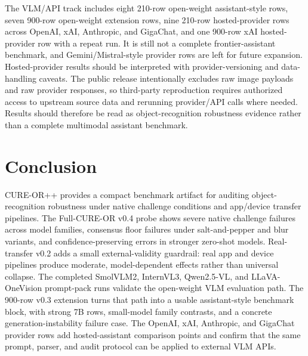 \documentclass[10pt]{article}
\begin{document}
The VLM/API track includes eight 210-row open-weight assistant-style rows, seven 900-row open-weight extension rows, nine 210-row hosted-provider rows across OpenAI, xAI, Anthropic, and GigaChat, and one 900-row xAI hosted-provider row with a repeat run. It is still not a complete frontier-assistant benchmark, and Gemini/Mistral-style provider rows are left for future expansion. Hosted-provider results should be interpreted with provider-versioning and data-handling caveats. The public release intentionally excludes raw image payloads and raw provider responses, so third-party reproduction requires authorized access to upstream source data and rerunning provider/API calls where needed. Results should therefore be read as object-recognition robustness evidence rather than a complete multimodal assistant benchmark.

\section{Conclusion}

CURE-OR++ provides a compact benchmark artifact for auditing object-recognition robustness under native challenge conditions and app/device transfer pipelines. The Full-CURE-OR v0.4 probe shows severe native challenge failures across model families, consensus floor failures under salt-and-pepper and blur variants, and confidence-preserving errors in stronger zero-shot models. Real-transfer v0.2 adds a small external-validity guardrail: real app and device pipelines produce moderate, model-dependent effects rather than universal collapse. The completed SmolVLM2, InternVL3, Qwen2.5-VL, and LLaVA-OneVision prompt-pack runs validate the open-weight VLM evaluation path. The 900-row v0.3 extension turns that path into a usable assistant-style benchmark block, with strong 7B rows, small-model family contrasts, and a concrete generation-instability failure case. The OpenAI, xAI, Anthropic, and GigaChat provider rows add hosted-assistant comparison points and confirm that the same prompt, parser, and audit protocol can be applied to external VLM APIs.



\end{document}
